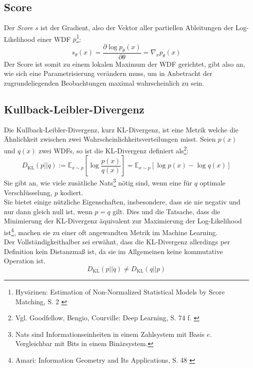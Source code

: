 \subsection{Score}

Der \textit{Score} $s$ ist der Gradient, also der Vektor aller partiellen Ableitungen der Log-Likelihood einer \ac{WDF} $p$\footnote{
    Hyvärinen: Estimation of Non-Normalized Statistical Models by Score Matching, S. 2
    \cite{JMLR:v6:hyvarinen05a}
}: 
\begin{equation}
    s_\theta(x) = \frac{\partial \log p_\theta(x)}{\partial \theta} 
    = \nabla_x p_\theta(x)
\end{equation}
Der Score ist somit zu einem lokalen Maximum der \ac{WDF} gerichtet, gibt also an, wie sich eine Parametrisierung verändern muss, um in Anbetracht der zugrundeliegenden Beobachtungen maximal wahrscheinlich zu sein.

\subsection{Kullback-Leibler-Divergenz}

Die Kullback-Leibler-Divergenz, kurz KL-Divergenz, ist eine Metrik welche die Ähnlichkeit zwischen zwei Wahrscheinlichkeitsverteilungen misst. Seien $p(x)$ und $q(x)$ zwei \ac{WDF}s, so ist die KL-Divergenz definiert als\footnote{
    Vgl. Goodfellow, Bengio, Courville: Deep Learning, S. 74 f.
    \cite{Goodfellow-et-al-2016}
}:
\begin{equation}
    D_\text{KL}(p||q) 
    := \mathbb{E}_{x \sim p} \left [
    \log \frac{p(x)} {q(x)}
    \right ]
    = \mathbb{E}_{x \sim p} \left [ 
        \log p(x) - \log q(x)
        \right ]
\end{equation}
Sie gibt an, wie viele zusätliche Nats\footnote{
    Nats sind Informationseinheiten in einem Zahlsystem mit Basis $e$. Vergleichbar mit Bits in einem Binärsystem. 
} nötig sind, wenn eine für $q$ optimale Verschlüsselung, $p$ kodiert. \\
Sie bietet einige nützliche Eigenschaften, insbesondere, dass sie nie negativ und nur dann gleich null ist, wenn $p = q$ gilt. Dies und die Tatsache, dass die Minimierung der KL-Divergenz äquivalent zur Maximierung der Log-Likelihood ist\footnote{
    Amari: Information Geometry and Its Applications, S. 48
    \cite{10.5555/3019383}
}, machen sie zu einer oft angewandten Metrik im Machine Learning. \\
Der Vollständigkeithalber sei erwähnt, dass die KL-Divergenz allerdings per Definition kein Distanzmaß ist, da sie im Allgemeinen keine kommutative Operation ist.  
\begin{equation}
    D_\text{KL}(p||q) \ne D_\text{KL}(q||p) 
\end{equation}


